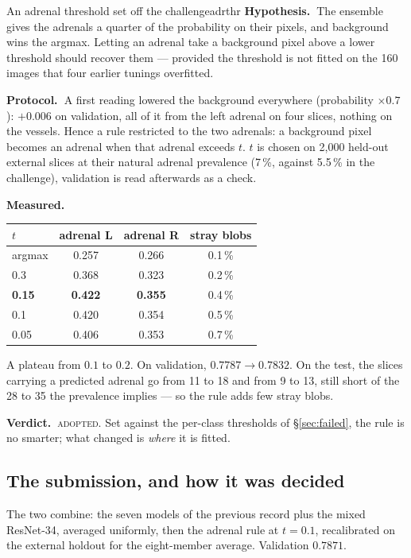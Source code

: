 \documentclass{article}
\newcommand{\hyp}{\textbf{Hypothesis.\ }}
\newcommand{\proto}{\textbf{Protocol.\ }}
\newcommand{\meas}{\textbf{Measured.\ }}
\newcommand{\verd}{\textbf{Verdict.\ }}
\newcommand{\adopted}{\textcolor{mygreen}{\textsc{adopted}}}
\begin{document}
\begin{expwin}{An adrenal threshold set off the challenge}{adrthr}
\hyp The ensemble gives the adrenals a quarter of the probability on their
pixels, and background wins the argmax. Letting an adrenal take a background
pixel above a lower threshold should recover them --- provided the threshold is
not fitted on the 160 images that four earlier tunings overfitted.

\proto A first reading lowered the background everywhere (probability
$\times 0.7$): $+0.006$ on validation, all of it from the left adrenal on four
slices, nothing on the vessels. Hence a rule restricted to the two adrenals: a
background pixel becomes an adrenal when that adrenal exceeds $t$. $t$ is chosen
on 2{,}000 held-out external slices at their natural adrenal prevalence (7\,\%,
against 5.5\,\% in the challenge), validation is read afterwards as a check.

\meas
\begin{center}
\begin{tabular}{lccc}
\hline
$t$ & \textbf{adrenal L} & \textbf{adrenal R} & \textbf{stray blobs} \\
\hline
argmax & 0.257 & 0.266 & 0.1\,\% \\
0.3 & 0.368 & 0.323 & 0.2\,\% \\
\textbf{0.15} & \textbf{0.422} & \textbf{0.355} & 0.4\,\% \\
0.1 & 0.420 & 0.354 & 0.5\,\% \\
0.05 & 0.406 & 0.353 & 0.7\,\% \\
\hline
\end{tabular}
\end{center}
A plateau from $0.1$ to $0.2$. On validation, $0.7787 \to 0.7832$. On the test,
the slices carrying a predicted adrenal go from 11 to 18 and from 9 to 13, still
short of the 28 to 35 the prevalence implies --- so the rule adds few stray
blobs.

\verd \adopted. Set against the per-class thresholds of \S\ref{sec:failed},
the rule is no smarter; what changed is \emph{where} it is fitted.
\end{expwin}

\subsection{The submission, and how it was decided}

The two combine: the seven models of the previous record plus the mixed
ResNet-34, averaged uniformly, then the adrenal rule at $t = 0.1$, recalibrated
on the external holdout for the eight-member average. Validation $0.7871$.
\end{document}
